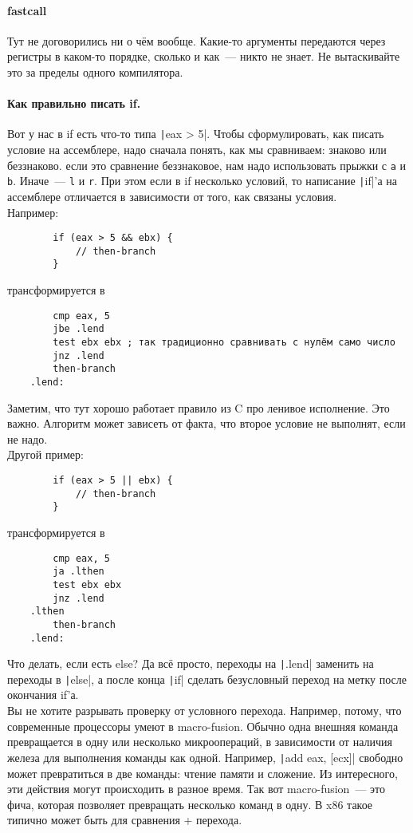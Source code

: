 \documentclass{article}
\begin{document}
    \paragraph{fastcall}
    Тут не договорились ни о чём вообще. Какие-то аргументы передаются через регистры в каком-то порядке, сколько и как~--- никто не знает. Не вытаскивайте это за пределы одного компилятора.
    \paragraph{Как правильно писать if.}
    Вот у нас в if есть что-то типа \texttt|eax > 5|. Чтобы сформулировать, как писать условие на ассемблере, надо сначала понять, как мы сравниваем: знаково или беззнаково. если это сравнение беззнаковое, нам надо использовать прыжки с \Verb|a| и \Verb|b|. Иначе~--- \Verb|l| и \Verb|r|. При этом если в if несколько условий, то написание \texttt|if|'а на ассемблере отличается в зависимости от того, как связаны условия.\\
    Например:
    \begin{verbatim}
        if (eax > 5 && ebx) {
            // then-branch
        }
    \end{verbatim}
    трансформируется в
    \begin{verbatim}
        cmp eax, 5
        jbe .lend
        test ebx ebx ; так традиционно сравнивать с нулём само число
        jnz .lend
        then-branch
    .lend:
    \end{verbatim}
    Заметим, что тут хорошо работает правило из C про ленивое исполнение. Это важно. Алгоритм может зависеть от факта, что второе условие не выполнят, если не надо.\\
    Другой пример:
    \begin{verbatim}
        if (eax > 5 || ebx) {
            // then-branch
        }
    \end{verbatim}
    трансформируется в
    \begin{verbatim}
        cmp eax, 5
        ja .lthen
        test ebx ebx
        jnz .lend
    .lthen
        then-branch
    .lend:
    \end{verbatim}
    Что делать, если есть else? Да всё просто, переходы на \texttt|.lend| заменить на переходы в \texttt|else|, а после конца \texttt|if| сделать безусловный переход на метку после окончания if'а.\\
    Вы не хотите разрывать проверку от условного перехода. Например, потому, что современные процессоры умеют в macro-fusion. Обычно одна внешняя команда превращается в одну или несколько микроопераций, в зависимости от наличия железа для выполнения команды как одной. Например, \texttt|add eax, [ecx]| свободно может превратиться в две команды: чтение памяти и сложение. Из интересного, эти действия могут происходить в разное время. Так вот macro-fusion~--- это фича, которая позволяет превращать несколько команд в одну. В x86 такое типично может быть для сравнения + перехода.\\
\end{document}
